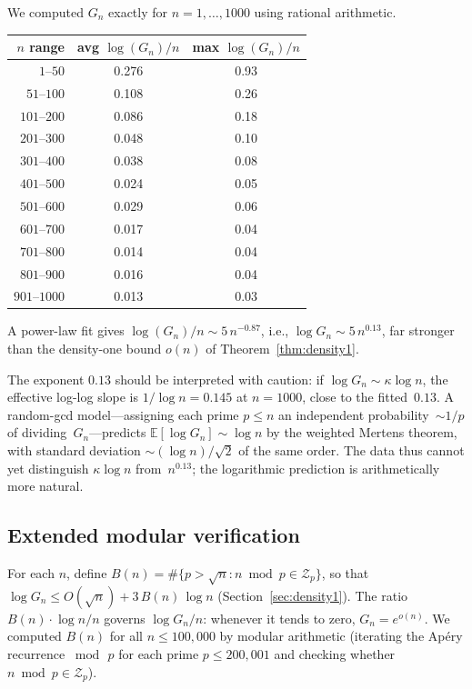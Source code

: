 \documentclass[11pt]{article}
\theoremstyle{definition}
\theoremstyle{remark}
\begin{document}
We computed $G_n$ exactly for $n = 1, \ldots, 1000$
using rational arithmetic.

\begin{center}
\begin{tabular}{rcc}
$n$ range & avg $\log(G_n)/n$ & max $\log(G_n)/n$ \\ \hline
$1$--$50$ & 0.276 & 0.93 \\
$51$--$100$ & 0.108 & 0.26 \\
$101$--$200$ & 0.086 & 0.18 \\
$201$--$300$ & 0.048 & 0.10 \\
$301$--$400$ & 0.038 & 0.08 \\
$401$--$500$ & 0.024 & 0.05 \\
$501$--$600$ & 0.029 & 0.06 \\
$601$--$700$ & 0.017 & 0.04 \\
$701$--$800$ & 0.014 & 0.04 \\
$801$--$900$ & 0.016 & 0.04 \\
$901$--$1000$ & 0.013 & 0.03
\end{tabular}
\end{center}

A power-law fit gives
$\log(G_n)/n \sim 5\,n^{-0.87}$,
i.e., $\log G_n \sim 5\,n^{0.13}$, far stronger
than the density-one bound $o(n)$ of Theorem~\ref{thm:density1}.

The exponent $0.13$ should be interpreted with caution:
if $\log G_n \sim \kappa \log n$,
the effective log-log slope is $1/\log n = 0.145$
at $n = 1000$, close to the fitted~$0.13$.
A random-gcd model---assigning each prime $p \le n$
an independent probability~$\sim 1/p$ of
dividing~$G_n$---predicts
$\mathbb{E}[\log G_n] \sim \log n$ by the
weighted Mertens theorem, with standard deviation
$\sim (\log n)/\sqrt{2}$ of the same order.
The data thus cannot yet distinguish $\kappa \log n$
from~$n^{0.13}$; the logarithmic prediction is
arithmetically more natural.

\subsection{Extended modular verification}

For each $n$, define
$B(n) = \#\{p > \sqrt{n} : n \bmod p \in \mathcal{Z}_p\}$,
so that $\log G_n \le O(\sqrt{n}) + 3\,B(n)\,\log n$
(Section~\ref{sec:density1}).
The ratio $B(n) \cdot \log n / n$
governs $\log G_n / n$:
whenever it tends to zero, $G_n = e^{o(n)}$.
We computed $B(n)$ for all $n \le 100{,}000$ by
modular arithmetic (iterating the Ap\'ery recurrence
$\bmod\,p$ for each prime $p \le 200{,}001$
and checking whether $n \bmod p \in \mathcal{Z}_p$).
\end{document}
